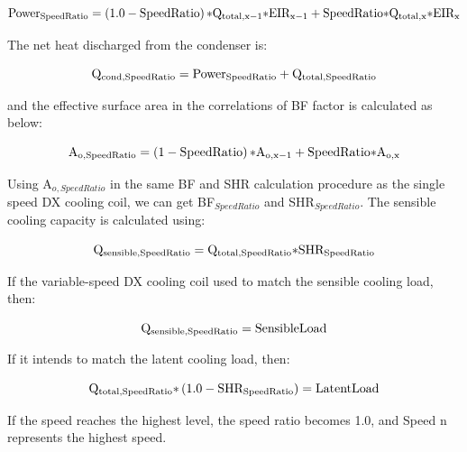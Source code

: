 \begin{equation}
{\rm{Powe}}{{\rm{r}}_{{\rm{SpeedRatio}}}} = \left( {1.0 - {\rm{SpeedRatio}}} \right){\rm{*}}{{\rm{Q}}_{{\rm{total}},{\rm{x}} - 1}}{\rm{*EI}}{{\rm{R}}_{{\rm{x}} - 1}} + {\rm{SpeedRatio*}}{{\rm{Q}}_{{\rm{total}},{\rm{x}}}}{\rm{*EI}}{{\rm{R}}_{\rm{x}}}
\end{equation}

The net heat discharged from the condenser is:

\begin{equation}
{{\rm{Q}}_{{\rm{cond}},{\rm{SpeedRatio}}}} = {\rm{Powe}}{{\rm{r}}_{{\rm{SpeedRatio}}}} + {{\rm{Q}}_{{\rm{total}},{\rm{SpeedRatio}}}}
\end{equation}

and the effective surface area in the correlations of BF factor is calculated as below:

\begin{equation}
{{\rm{A}}_{{\rm{o}},{\rm{SpeedRatio}}}} = \left( {1 - {\rm{SpeedRatio}}} \right){\rm{*}}{{\rm{A}}_{{\rm{o}},{\rm{x}} - 1}} + {\rm{SpeedRatio*}}{{\rm{A}}_{{\rm{o}},{\rm{x}}}}
\end{equation}

Using A\(_{o,SpeedRatio}\) in the same BF and SHR calculation procedure as the single speed DX cooling coil, we can get BF\(_{SpeedRatio}\) and SHR\(_{SpeedRatio}\).  The sensible cooling capacity is calculated using:

\begin{equation}
{{\rm{Q}}_{{\rm{sensible}},{\rm{SpeedRatio}}}} = {{\rm{Q}}_{{\rm{total}},{\rm{SpeedRatio}}}}{\rm{*SH}}{{\rm{R}}_{{\rm{SpeedRatio}}}}
\end{equation}

If the variable-speed DX cooling coil used to match the sensible cooling load, then:

\begin{equation}
{{\rm{Q}}_{{\rm{sensible}},{\rm{SpeedRatio}}}} = {\rm{SensibleLoad}}
\end{equation}

If it intends to match the latent cooling load, then:

\begin{equation}
{{\rm{Q}}_{{\rm{total}},{\rm{SpeedRatio}}}}{\rm{*}}\left( {1.0 - {\rm{SH}}{{\rm{R}}_{{\rm{SpeedRatio}}}}} \right) = {\rm{LatentLoad}}
\end{equation}

If the speed reaches the highest level, the speed ratio becomes 1.0, and Speed n represents the highest speed.

